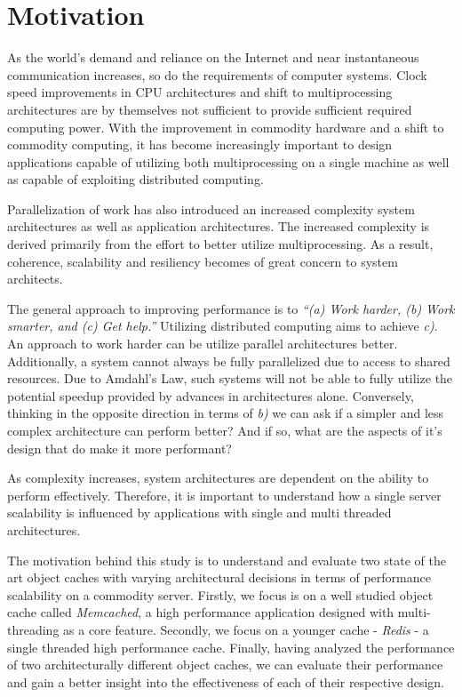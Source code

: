 \section{Motivation}

As the world's demand and reliance on the Internet and near instantaneous communication increases, so do the requirements of computer systems. Clock speed improvements in CPU architectures and shift to multiprocessing architectures are by themselves not sufficient to provide sufficient required computing power. With the improvement in commodity hardware and a shift to commodity computing, it has become increasingly important to design applications capable of utilizing both multiprocessing on a single machine as well as capable of exploiting distributed computing.

Parallelization of work has also introduced an increased complexity system architectures as well as application architectures. The increased complexity is derived primarily from the effort to better utilize multiprocessing. As a result, coherence, scalability and resiliency becomes of great concern to system architects.

The general approach to improving performance is to \textit{``(a) Work harder, (b) Work smarter, and (c) Get help.''} \cite{pfister1998search} Utilizing distributed computing aims to achieve \textit{c)}. An approach to work harder can be utilize parallel architectures better.  Additionally, a system cannot always be fully parallelized due to access to shared resources. Due to Amdahl's Law, such systems will not be able to fully utilize the potential speedup provided by advances in architectures alone. Conversely, thinking in the opposite direction in terms of \textit{b)} we can ask if a simpler and less complex architecture can perform better? And if so, what are the aspects of it's design that do make it more performant?

As complexity increases, system architectures are dependent on the ability to perform effectively. Therefore, it is important to understand how a single server scalability is influenced by applications with single and multi threaded architectures.

The motivation behind this study is to understand and evaluate two state of the art object caches with varying architectural decisions in terms of performance scalability on a commodity server. Firstly, we focus is on a well studied object cache called \emph{Memcached}, a high performance application designed with multi-threading as a core feature. Secondly, we focus on a younger cache - \emph{Redis} - a single threaded high performance cache. Finally, having analyzed the performance of two architecturally different object caches, we can evaluate their performance and gain a better insight into the effectiveness of each of their respective design.







